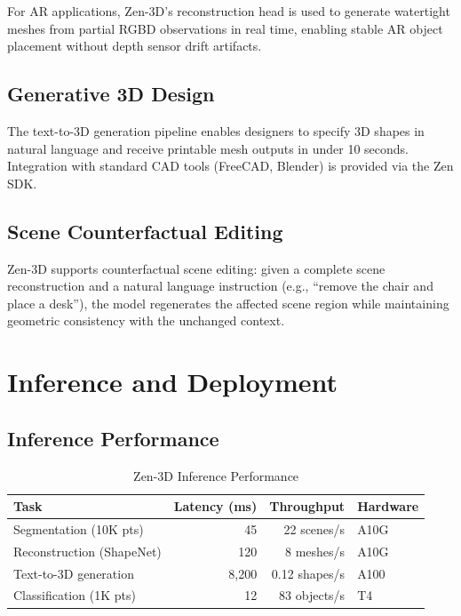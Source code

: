 \documentclass[11pt,a4paper]{article}
\begin{document}
For AR applications, Zen-3D's reconstruction head is used to generate watertight meshes from
partial RGBD observations in real time, enabling stable AR object placement without depth
sensor drift artifacts.

\subsection{Generative 3D Design}

The text-to-3D generation pipeline enables designers to specify 3D shapes in natural language
and receive printable mesh outputs in under 10 seconds. Integration with standard CAD tools
(FreeCAD, Blender) is provided via the Zen SDK.

\subsection{Scene Counterfactual Editing}

Zen-3D supports counterfactual scene editing: given a complete scene reconstruction and a natural
language instruction (e.g., ``remove the chair and place a desk''), the model regenerates the
affected scene region while maintaining geometric consistency with the unchanged context.

\section{Inference and Deployment}

\subsection{Inference Performance}

\begin{table}[H]
\centering
\begin{tabular}{lrrl}
\toprule
\textbf{Task} & \textbf{Latency (ms)} & \textbf{Throughput} & \textbf{Hardware} \\
\midrule
Segmentation (10K pts) & 45 & 22 scenes/s & A10G \\
Reconstruction (ShapeNet) & 120 & 8 meshes/s & A10G \\
Text-to-3D generation & 8,200 & 0.12 shapes/s & A100 \\
Classification (1K pts) & 12 & 83 objects/s & T4 \\
\bottomrule
\end{tabular}
\caption{Zen-3D Inference Performance}
\end{table}
\end{document}
